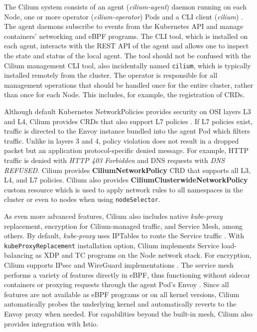 \documentclass[english, 12pt, a4paper, sci, utf8, a-2b, online]{aaltothesis}
\begin{document}
The Cilium system consists of an agent (\emph{cilium-agent}) daemon running on each Node, one or more operator (\emph{cilium-operator}) Pods and a CLI client (\emph{cilium}) \cite{cilium-components}.
The agent daemons subscribe to events from the Kubernetes API and manage containers' networking and eBPF programs.
The CLI tool, which is installed on each agent, interacts with the REST API of the agent and allows one to inspect the state and status of the local agent.
The tool should not be confused with the Cilium management CLI tool, also incidentally named \lstinline{cilium}, which is typically installed remotely from the cluster.
The operator is responsible for all management operations that should be handled once for the entire cluster, rather than once for each Node.
This includes, for example, the registration of CRDs.

Although default Kubernetes NetworkPolicies provides security on OSI layers L3 and L4, Cilium provides CRDs that also support L7 policies \cite{cilium-policy-language}.
If L7 policies exist, traffic is directed to the Envoy instance bundled into the agent Pod which filters traffic.
Unlike in layers 3 and 4, policy violation does not result in a dropped packet but an application protocol-specific denied message.
For example, HTTP traffic is denied with \emph{HTTP 403 Forbidden} and DNS requests with \emph{DNS REFUSED}.
Cilium provides \textbf{CiliumNetworkPolicy} CRD that supports all L3, L4, and L7 policies.
Cilium also provides \textbf{CiliumClusterwideNetworkPolicy} custom resource which is used to apply network rules to all namespaces in the cluster or even to nodes when using \lstinline{nodeSelector}.

As even more advanced features, Cilium also includes native \emph{kube-proxy} replacement, encryption for Cilium-managed traffic, and Service Mesh, among others.
By default, \emph{kube-proxy} uses IPTables to route the Service traffic \cite{cilium-proxy-free}.
With \lstinline{kubeProxyReplacement} installation option, Cilium implements Service load-balancing as XDP and TC programs on the Node network stack.
For encryption, Cilium supports IPsec and WireGuard implementations \cite{cilium-encryption}.
The service mesh performs a variety of features directly in eBPF, thus functioning without sidecar containers or proxying requests through the agent Pod's Envoy \cite{cilium-service-mesh}.
Since all features are not available as eBPF programs or on all kernel versions,  Cilium automatically probes the underlying kernel and automatically reverts to the Envoy proxy when needed.
For capabilities beyond the built-in mesh, Cilium also provides integration with Istio.
\end{document}
